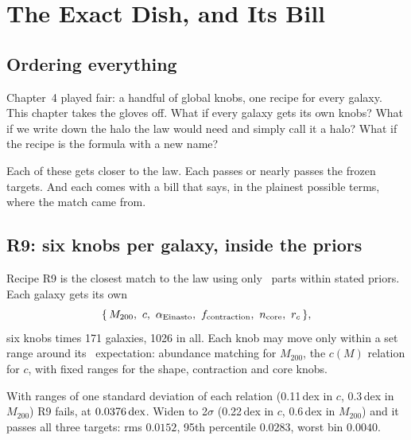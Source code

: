 \chapter{The Exact Dish, and Its Bill}




\section{Ordering everything}

Chapter~4 played fair: a handful of global knobs, one recipe for every galaxy. This chapter takes the gloves off. What if every galaxy gets its own knobs? What if we write down the halo the law would need and simply call it a halo? What if the recipe is the formula with a new name?

Each of these gets closer to the law. Each passes or nearly passes the frozen targets. And each comes with a bill that says, in the plainest possible terms, where the match came from.

\section{R9: six knobs per galaxy, inside the priors}

Recipe R9 is the closest match to the law using only \LCDM\ parts within stated priors. Each galaxy gets its own
\begin{equation}
\{\,M_{200},\ c,\ \alpha_{\rm Einasto},\ f_{\rm contraction},\ n_{\rm core},\ r_c\,\},
\end{equation}
six knobs times 171 galaxies, 1026 in all. Each knob may move only within a set range around its \LCDM\ expectation: abundance matching for $M_{200}$, the $c(M)$ relation for $c$, with fixed ranges for the shape, contraction and core knobs.

With ranges of one standard deviation of each relation (0.11\,dex in $c$, 0.3\,dex in $M_{200}$) R9 fails, at $0.0376\,\mathrm{dex}$. Widen to 2$\sigma$ (0.22\,dex in $c$, 0.6\,dex in $M_{200}$) and it passes all three targets: rms $0.0152$, 95th percentile $0.0283$, worst bin $0.0040$.

